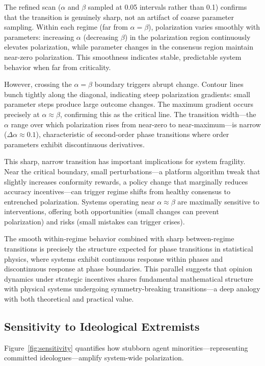\documentclass[11pt,a4paper]{article}
\begin{document}
The refined scan ($\alpha$ and $\beta$ sampled at 0.05 intervals rather than 0.1) confirms that the transition is genuinely sharp, not an artifact of coarse parameter sampling. Within each regime (far from $\alpha = \beta$), polarization varies smoothly with parameters: increasing $\alpha$ (decreasing $\beta$) in the polarization region continuously elevates polarization, while parameter changes in the consensus region maintain near-zero polarization. This smoothness indicates stable, predictable system behavior when far from criticality.

However, crossing the $\alpha = \beta$ boundary triggers abrupt change. Contour lines bunch tightly along the diagonal, indicating steep polarization gradients: small parameter steps produce large outcome changes. The maximum gradient occurs precisely at $\alpha \approx \beta$, confirming this as the critical line. The transition width—the $\alpha$ range over which polarization rises from near-zero to near-maximum—is narrow ($\Delta\alpha \approx 0.1$), characteristic of second-order phase transitions where order parameters exhibit discontinuous derivatives.

This sharp, narrow transition has important implications for system fragility. Near the critical boundary, small perturbations—a platform algorithm tweak that slightly increases conformity rewards, a policy change that marginally reduces accuracy incentives—can trigger regime shifts from healthy consensus to entrenched polarization. Systems operating near $\alpha \approx \beta$ are maximally sensitive to interventions, offering both opportunities (small changes can prevent polarization) and risks (small mistakes can trigger crises).

The smooth within-regime behavior combined with sharp between-regime transitions is precisely the structure expected for phase transitions in statistical physics, where systems exhibit continuous response within phases and discontinuous response at phase boundaries. This parallel suggests that opinion dynamics under strategic incentives shares fundamental mathematical structure with physical systems undergoing symmetry-breaking transitions—a deep analogy with both theoretical and practical value.

\subsection{Sensitivity to Ideological Extremists}

Figure~\ref{fig:sensitivity} quantifies how stubborn agent minorities—representing committed ideologues—amplify system-wide polarization.
\end{document}

